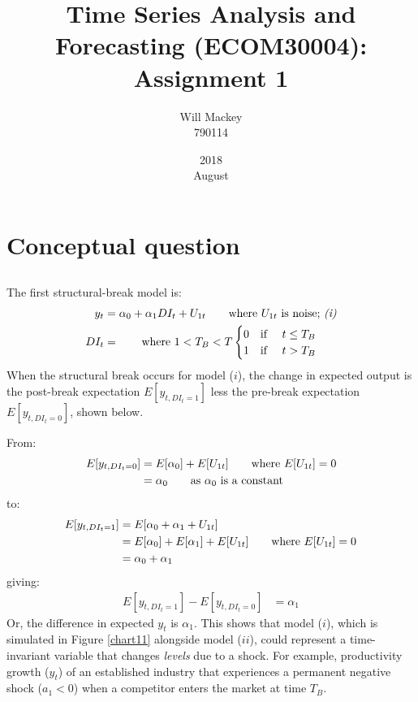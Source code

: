 \documentclass{article}
\title{Time Series Analysis and Forecasting (ECOM30004): Assignment 1}
\date{2018\\ August}
\author{Will Mackey\\ 790114}
\begin{document}

\maketitle




\section{Conceptual question}

\subsection{} %
    The first structural-break model is:
        \begin{align*}
          y_t  &= \alpha_0 + \alpha_1 DI_{t} + U_{1t}    \tag*{where $U_{1t}$ is noise; \textit{(i)}} \\
          DI_t &=                                      \tag*{where $1< T_B <T$}
          \begin{cases}
            0 \text{\quad  if \quad} t \leq T_B \\
            1 \text{\quad  if \quad} t >    T_B
          \end{cases}
        \end{align*}
    When the structural break occurs for model ($i$), the change in expected output is the post-break expectation $E[y_{t,DI_{t}=1}]$ less the pre-break expectation $E[y_{t,DI_{t}=0}]$, shown below.

    From:
        \begin{align*}
          E[y_{t,DI_{t}=0}] &= E[\alpha_0] + E[U_{1t}]    \tag*{where $E[U_{1t}]=0$} \\ 
                      &= \alpha_0                         \tag*{as $\alpha_0$ is a constant}
        \end{align*}
    to:
        \begin{align*}
          E[y_{t,DI_{t}=1}] &= E[\alpha_0 + \alpha_1 + U_{1t}]                                 \\ 
                            &= E[\alpha_0] + E[\alpha_1]   + E[U_{1t}]    \tag*{where $E[U_{1t}]=0$} \\ 
                            &= \alpha_0  + \alpha_1
        \end{align*}
    giving:
        \begin{align*}
          E[y_{t,DI_{t}=1}] - E[y_{t,DI_{t}=0}] &= \alpha_1
        \end{align*}
    Or, the difference in expected $y_t$ is $\alpha_1$. This shows that model ($i$), which is simulated in Figure \ref{chart11} alongside model ($ii$), could represent a time-invariant variable that changes \textit{levels} due to a shock. For example, productivity growth ($y_t$) of an established industry that experiences a permanent negative shock ($a_1<0$) when a competitor enters the market at time $T_B$.
\end{document}
